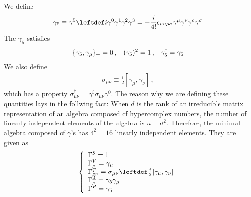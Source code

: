 We define
\begin{eqnarray}
\gamma_5 \equiv \gamma^5 \leftdef
i \gamma^0 \gamma^1 \gamma^2 \gamma^3
=
- \frac{i}{4!}
\epsilon_{\mu \nu \rho \sigma}
\gamma^\mu \gamma^\nu \gamma^\rho \gamma^\sigma
\end{eqnarray}
The $\gamma_5$ satisfies
\begin{eqnarray}
\{
\gamma_5, \gamma_\mu 
\}_+ = 0\,,
\hspace{3mm}
(\gamma_5)^2 = 1\,,
\hspace{3mm}
\gamma_5^\dagger = \gamma_5
\end{eqnarray}
We also define
\begin{eqnarray}
\sigma_{\mu \nu} \equiv
\frac{i}{2}
[ \gamma_\mu, \gamma_\nu]\,,
\end{eqnarray}
which has a property $\sigma_{\mu \nu}^\dagger = \gamma^0 \sigma_{\mu \nu} \gamma^0$.
The reason why we are defining these quantities lays in the follwing fact:
When $d$ is the rank of an irreducible matrix representation of an algebra composed of hypercomplex numbers,
the number of linearly independent elements of the algebra is $n = d^2$. Therefore, the minimal algebra composed
of $\gamma$'s has $4^2 = 16$ linearly independent elements. They are given as
\begin{eqnarray}
\left\{
\begin{array}{l}
\Gamma^S
=
1
\\
\Gamma^V_\mu
=
\gamma_\mu
\\
\Gamma^T_{\mu \nu}
=
\sigma_{\mu \nu} \leftdef
\frac{i}{2}
[ \gamma_\mu, \gamma_\nu]
\\
\Gamma^A_{\mu}
=
\gamma_5 \gamma_\mu
\\
\Gamma^P
=
\gamma_5
\end{array}
\right.
\end{eqnarray}

